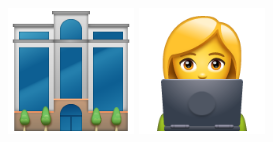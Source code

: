 \documentclass{beamer}
\begin{document}
\begin{frame}
    \begin{center}
    \includegraphics[width=0.25\textwidth]{static/office-building.png}\hspace{20pt}
    \pause
    \includegraphics[width=0.25\textwidth]{static/woman-technologist.png}
    \end{center}
\end{frame}




\end{document}
